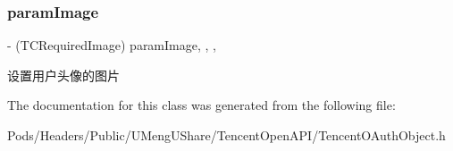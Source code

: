 \subsubsection{\texorpdfstring{param\+Image}{paramImage}}
{\footnotesize\ttfamily -\/ (T\+C\+Required\+Image) param\+Image\hspace{0.3cm}{\ttfamily [read]}, {\ttfamily [write]}, {\ttfamily [nonatomic]}, {\ttfamily [retain]}}

设置用户头像的图片 

The documentation for this class was generated from the following file\+:\begin{DoxyCompactItemize}
\item 
Pods/\+Headers/\+Public/\+U\+Meng\+U\+Share/\+Tencent\+Open\+A\+P\+I/Tencent\+O\+Auth\+Object.\+h\end{DoxyCompactItemize}
